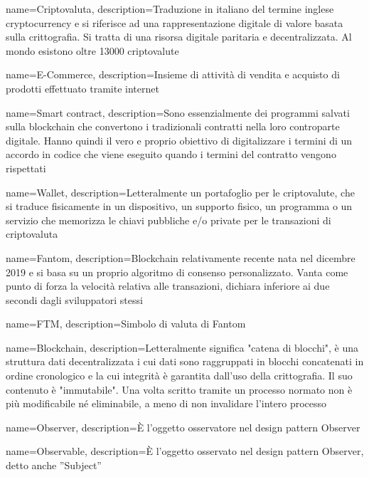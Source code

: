 {
  name={Criptovaluta},
  description={Traduzione in italiano del termine inglese cryptocurrency e si riferisce ad una rappresentazione digitale di valore basata sulla crittografia. Si tratta di una risorsa digitale paritaria e decentralizzata. Al mondo esistono oltre 13000 criptovalute}
}

{
  name={E-Commerce},
  description={Insieme di attività di vendita e acquisto di prodotti effettuato tramite internet}
}

{
  name={Smart contract},
  description={Sono essenzialmente dei programmi salvati sulla blockchain che convertono i tradizionali contratti nella loro controparte digitale. Hanno quindi il vero e proprio obiettivo di digitalizzare i termini di un accordo in codice che viene eseguito quando i termini del contratto vengono rispettati}
}

{
  name={Wallet},
  description={Letteralmente un portafoglio per le criptovalute, che si traduce fisicamente in un dispositivo, un supporto fisico, un programma o un servizio che memorizza le chiavi pubbliche e/o private per le transazioni di criptovaluta}
}

{
  name={Fantom},
  description={Blockchain relativamente recente nata nel dicembre 2019 e si basa su un proprio algoritmo di consenso personalizzato. Vanta come punto di forza la velocità relativa alle transazioni, dichiara inferiore ai due secondi dagli sviluppatori stessi}
}

{
  name={FTM},
  description={Simbolo di valuta di Fantom}
}

{
  name={Blockchain},
  description={Letteralmente significa "catena di blocchi", è una struttura dati decentralizzata i cui dati sono raggruppati in blocchi concatenati in ordine cronologico e la cui integrità è garantita dall'uso della crittografia. Il suo contenuto è "immutabile". Una volta scritto tramite un processo normato non è più modificabile né eliminabile, a meno di non invalidare l'intero processo}
}

{
  name={Observer},
  description={È l’oggetto osservatore nel design pattern Observer\glo}
}

{
  name={Observable},
  description={È l’oggetto osservato nel design pattern Observer\glo, detto anche ”Subject”}
}

